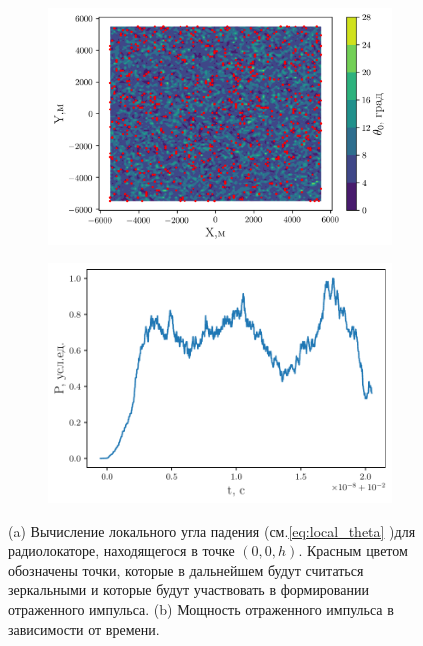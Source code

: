  \begin{figure}[H]
     \begin{subfigure}{.59\linewidth}
         \centering
         \includegraphics[width=\linewidth]{fig/model_mirrors3}
         \caption{}
     \end{subfigure}
     \begin{subfigure}{.39\linewidth}
         \centering
         \includegraphics[width=\linewidth]{fig/model_impuls3}
         \caption{}
     \end{subfigure}
     \caption{(a) Вычисление локального угла падения (см.\eqref{eq:local_theta} )для радиолокаторе,
     находящегося в точке $(0,0,h)$. Красным цветом обозначены точки, которые в
 дальнейшем будут считаться зеркальными и которые будут участвовать в
 формировании отраженного импульса.
 (b) Мощность отраженного импульса в зависимости от времени.}
    \label{fig:}
 \end{figure}


